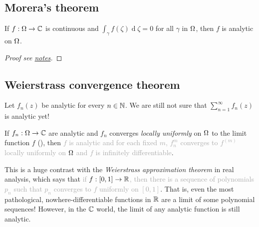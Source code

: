 \documentclass[12pt]{article}
\renewcommand{\d}{\ensuremath{\operatorname{d}}}
\begin{document}
\subsection{Morera's theorem}
\begin{theorem}[Morera]
    If $f:\Omega\to\mathbb{C}$ is continuous and $\int_{\gamma}f(\zeta)\d\zeta=0$ for all \underline{\hspace{2cm}} $\gamma$ in $\Omega$, then $f$ is analytic on $\Omega$. 
\end{theorem}
\begin{proof}[Proof see \href{https://stephangarcia.sites.pomona.edu/teaching/24S-135/Lecture/24S-135-Lecture16.pdf}{notes}]
\end{proof}

\subsection{Weierstrass convergence theorem}
Let $f_n(z)$ be analytic for every $n\in \mathbb{N}$. We are still not sure that $\sum_{n=1}^{\infty} f_n(z)$ is analytic yet!

\begin{theorem}
    If $f_n:\Omega\to \mathbb{C}$ are analytic and $f_n$ converges \textit{locally uniformly} on $\Omega$ to the limit function $f$ (), then \textcolor{darkgray}{$f$ is analytic and for each fixed $m$, $f_n^{m}$ converges to $f^{(m)}$ locally uniformly on $\Omega$ and $f$ is infinitely differentiable}. 
\end{theorem}

\rmk This is a huge contrast with the\textit{ Weierstrass approximation theorem} in real analysis, which says that \textcolor{darkgray}{if $f:[0,1]\to \mathbb{R}$, then there is a sequence of polynomials $p_n$ such that $p_n$ converges to $f$ uniformly on $[0,1]$}. That is, even the most pathological, nowhere-differentiable functions in $\mathbb{R}$ are a limit of some polynomial sequences! However, in the $\mathbb{C}$ world, the limit of any analytic function is still analytic.
\end{document}

